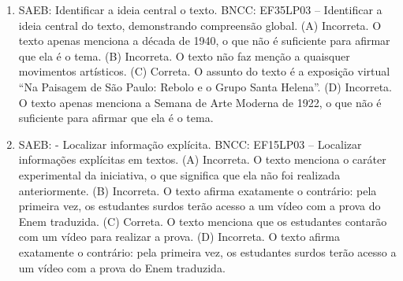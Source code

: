 \begin{enumerate}
\item
SAEB: Identificar a ideia central o texto. BNCC: EF35LP03 -- Identificar a ideia central do texto, demonstrando compreensão global. 
(A) Incorreta. O texto apenas menciona a década de 1940, o que não é suficiente para afirmar que ela é o tema. 
(B) Incorreta. O texto não faz menção a quaisquer movimentos artísticos. 
(C) Correta. O assunto do texto é a exposição virtual ``Na Paisagem de São Paulo: Rebolo e o Grupo Santa Helena''. 
(D) Incorreta. O texto apenas menciona a Semana de Arte Moderna de 1922, o que não é suficiente para afirmar que ela é o tema.

\item
SAEB: - Localizar informação explícita. BNCC: EF15LP03 -- Localizar informações explícitas em textos. 
(A) Incorreta. O texto menciona o caráter experimental da iniciativa, o que significa que ela não foi realizada anteriormente. 
(B) Incorreta. O texto afirma exatamente o contrário: pela primeira vez, os estudantes surdos terão acesso a um vídeo com a prova do Enem traduzida. 
(C) Correta. O texto menciona que os estudantes contarão com um vídeo para realizar a prova. 
(D) Incorreta. O texto afirma exatamente o contrário: pela primeira vez, os estudantes surdos terão acesso a um vídeo com a prova do Enem traduzida.
\end{enumerate}